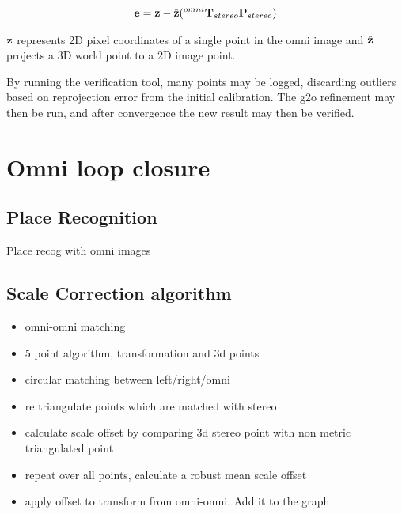 \begin{align}
 \mathbf e = \mathbf z - \hat{\mathbf z}( ^{omni}\mathbf T_{stereo} \mathbf P_{stereo})
\end{align}

$\mathbf z$ represents 2D pixel coordinates of a single point in the omni image and $\hat{\mathbf z}$ projects a 3D world point to a 2D image point.

By running the verification tool, many points may be logged, discarding outliers based on reprojection error from the initial calibration.  The g2o refinement may then be run, and after convergence the new result may then be verified.

\section{Omni loop closure}

\subsection{Place Recognition}

Place recog with omni images

\subsection{Scale Correction algorithm}

\begin{itemize}
\itemsep0em
 \item omni-omni matching
 \item 5 point algorithm, transformation and 3d points
 \item circular matching between left/right/omni
 \item re triangulate points which are matched with stereo
 \item calculate scale offset by comparing 3d stereo point with non metric triangulated point
 \item repeat over all points, calculate a robust mean scale offset
 \item apply offset to transform from omni-omni. Add it to the graph
\end{itemize}


